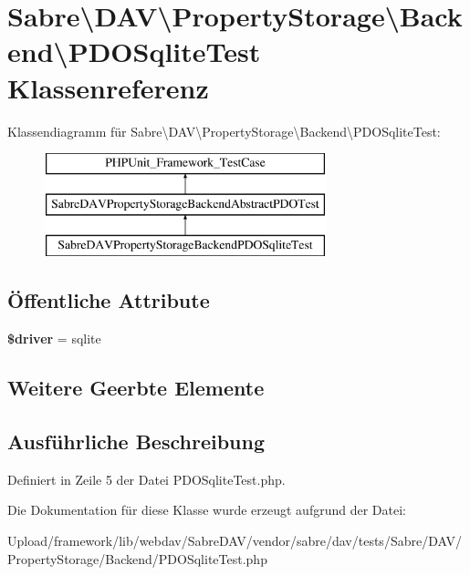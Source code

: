 \hypertarget{class_sabre_1_1_d_a_v_1_1_property_storage_1_1_backend_1_1_p_d_o_sqlite_test}{}\section{Sabre\textbackslash{}D\+AV\textbackslash{}Property\+Storage\textbackslash{}Backend\textbackslash{}P\+D\+O\+Sqlite\+Test Klassenreferenz}
\label{class_sabre_1_1_d_a_v_1_1_property_storage_1_1_backend_1_1_p_d_o_sqlite_test}
Klassendiagramm für Sabre\textbackslash{}D\+AV\textbackslash{}Property\+Storage\textbackslash{}Backend\textbackslash{}P\+D\+O\+Sqlite\+Test\+:\begin{figure}[H]
\begin{center}
\leavevmode
\includegraphics[height=3.000000cm]{class_sabre_1_1_d_a_v_1_1_property_storage_1_1_backend_1_1_p_d_o_sqlite_test}
\end{center}
\end{figure}
\subsection*{Öffentliche Attribute}
\begin{DoxyCompactItemize}
\item 
\mbox{\label{class_sabre_1_1_d_a_v_1_1_property_storage_1_1_backend_1_1_p_d_o_sqlite_test_a83c752f828149e699f1131d95d662b8e}} 
{\bfseries \$driver} = \textquotesingle{}sqlite\textquotesingle{}
\end{DoxyCompactItemize}
\subsection*{Weitere Geerbte Elemente}


\subsection{Ausführliche Beschreibung}


Definiert in Zeile 5 der Datei P\+D\+O\+Sqlite\+Test.\+php.



Die Dokumentation für diese Klasse wurde erzeugt aufgrund der Datei\+:\begin{DoxyCompactItemize}
\item 
Upload/framework/lib/webdav/\+Sabre\+D\+A\+V/vendor/sabre/dav/tests/\+Sabre/\+D\+A\+V/\+Property\+Storage/\+Backend/P\+D\+O\+Sqlite\+Test.\+php\end{DoxyCompactItemize}
